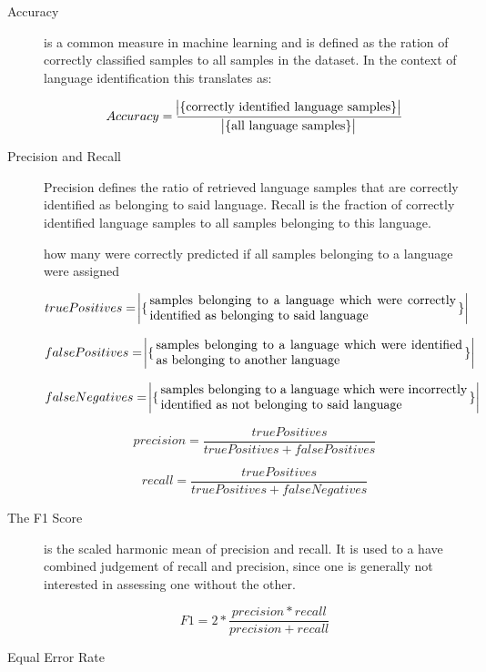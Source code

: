 \begin{description}
    \item[Accuracy] is a common measure in machine learning and is defined as the ration of correctly classified samples to all samples in the dataset. In the context of language identification this translates as:
     
    	$$
		Accuracy = \frac{\abs{\{\text{correctly identified language samples}\}}}{\abs{\{\text{all language samples}\}}}
		$$
     
    
    \item[Precision and Recall] Precision defines the ratio of retrieved language samples that are correctly identified as belonging to said language. Recall is the fraction of correctly identified language samples to all samples belonging to this language.
    
    
    	how many were correctly predicted
    	if all samples belonging to a language were assigned
     
		$$
 		truePositives = \abs{\set{\parbox{0.7\textwidth}{samples belonging to a language which were correctly identified as belonging to said language}}} 
		$$

		$$
 		falsePositives = \abs{\set{\parbox{0.7\textwidth}{samples belonging to a language which were identified as belonging to another language}}} 
		$$
		
		$$
 		falseNegatives = \abs{\set{\parbox{0.7\textwidth}{samples belonging to a language which were incorrectly identified as not belonging to said language}}} 
		$$

	    $$
	    precision = \frac
	      {truePositives}
	      {truePositives + falsePositives}
	    $$
		
		$$
		recall = \frac
			{truePositives}
			{truePositives + falseNegatives}
		$$    


    \item[The F1 Score] is the scaled harmonic mean of precision and recall. It is used to a have combined judgement of recall and precision, since one is generally not interested in assessing one without the other.
    
    	$$
    	F1 = 2 * \frac{precision * recall}{precision + recall}
    	$$
    \item[Equal Error Rate]
\end{description}


